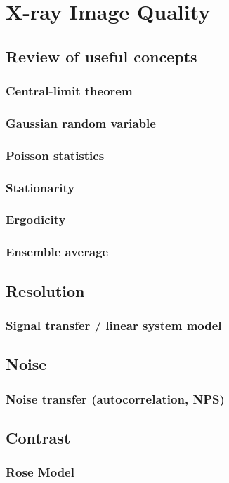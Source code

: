 \documentclass[11pt]{article}
\begin{document}
\section{X-ray Image Quality}
\subsection{Review of useful concepts}
\subsubsection{Central-limit theorem}
\subsubsection{Gaussian random variable}
\subsubsection{Poisson statistics}
\subsubsection{Stationarity}
\subsubsection{Ergodicity}
\subsubsection{Ensemble average}
\subsection{Resolution}
\subsubsection{Signal transfer / linear system model}
\subsection{Noise}
\subsubsection{Noise transfer (autocorrelation, NPS)}
\subsection{Contrast}
\subsubsection{Rose Model}
\end{document}
